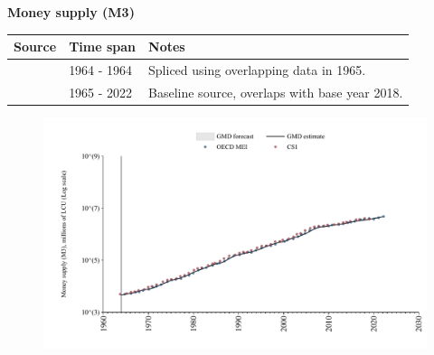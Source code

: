\documentclass[12pt,a4paper,landscape]{article}
\begin{document}
\begin{adjustbox}{max totalsize={\paperwidth}{\paperheight},center}
\begin{minipage}[t][\textheight][t]{\textwidth}
\vspace*{0.5cm}
{}
\begin{center}
{\Large\bfseries Money supply (M3)}
\end{center}
\vspace{0.5cm}
\begin{table}[H]
\centering
\small
\begin{tabular}{|l|l|l|}
\hline
\textbf{Source} & \textbf{Time span} & \textbf{Notes} \\
\hline
\rowcolor{white}\cite{CS1_ZAF}& 1964 - 1964 &Spliced using overlapping data in 1965. \\
\rowcolor{lightgray}\cite{OECD_MEI}& 1965 - 2022 &Baseline source, overlaps with base year 2018. \\
\hline
\end{tabular}
\end{table}
\begin{figure}[H]
\centering
\includegraphics[width=\textwidth,height=0.6\textheight,keepaspectratio]{graphs/ZAF_M3.pdf}
\end{figure}
\end{minipage}
\end{adjustbox}
\end{document}
